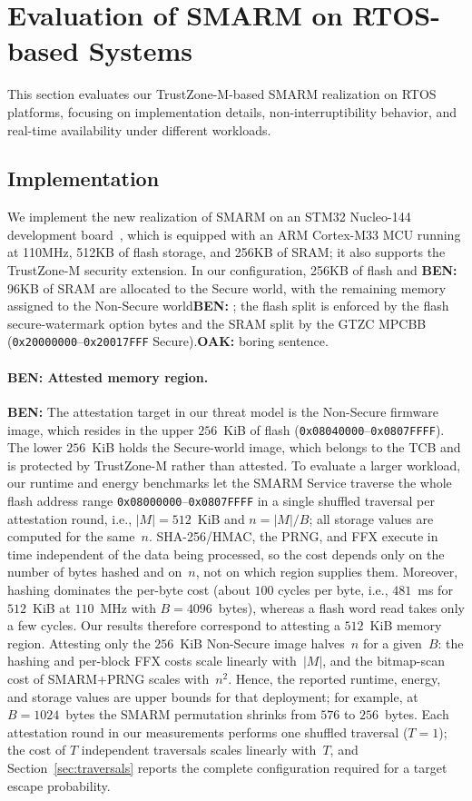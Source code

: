 \documentclass{ieeeaccess}
\DeclareRobustCommand{\oak}[1]{{\color{OAKcolor}\textbf{OAK:} #1}}
\DeclareRobustCommand{\ben}[1]{{\color{BENcolor}\textbf{BEN:} #1}}
\newcommand{\rtsmarmone}{SMARM+PRNG\xspace}
\begin{document}
\section{Evaluation of SMARM on RTOS-based Systems}
\label{sec:evaluation}

This section evaluates our TrustZone-M-based SMARM realization on RTOS platforms, focusing on implementation details, non-interruptibility behavior, and real-time availability under different workloads.

\subsection{Implementation}

We implement the new realization of SMARM on an STM32 Nucleo-144 development board~\cite{stm32l552_nucleo144}, which is equipped with an ARM Cortex-M33 MCU running at 110MHz, 512KB of flash storage, and 256KB of SRAM;
it also supports the TrustZone-M security extension.
In our configuration, 256KB of flash and \ben{96KB} of SRAM are allocated to the Secure world, with the remaining memory assigned to the Non-Secure world\ben{; the flash split is enforced by the flash secure-watermark option bytes and the SRAM split by the GTZC MPCBB (\texttt{0x20000000}--\texttt{0x20017FFF} Secure)}.\oak{boring sentence.}

\paragraph{\ben{Attested memory region.}}
\ben{The attestation target in our threat model is the Non-Secure firmware image, which resides in the upper $256$~KiB of flash (\texttt{0x08040000}--\texttt{0x0807FFFF}).
The lower $256$~KiB holds the Secure-world image, which belongs to the TCB and is protected by TrustZone-M rather than attested.
To evaluate a larger workload, our runtime and energy benchmarks let the SMARM Service traverse the whole flash address range \texttt{0x08000000}--\texttt{0x0807FFFF} in a single shuffled traversal per attestation round, i.e., $|M| = 512$~KiB and $n = |M|/B$; all storage values are computed for the same~$n$.
SHA-256/HMAC, the PRNG, and FFX execute in time independent of the data being processed, so the cost depends only on the number of bytes hashed and on~$n$, not on which region supplies them.
Moreover, hashing dominates the per-byte cost (about $100$ cycles per byte, i.e., $481$~ms for $512$~KiB at $110$~MHz with $B = 4096$~bytes), whereas a flash word read takes only a few cycles.
Our results therefore correspond to attesting a $512$~KiB memory region.
Attesting only the $256$~KiB Non-Secure image halves~$n$ for a given~$B$: the hashing and per-block FFX costs scale linearly with~$|M|$, and the bitmap-scan cost of \rtsmarmone scales with~$n^2$.
Hence, the reported runtime, energy, and storage values are upper bounds for that deployment; for example, at $B = 1024$~bytes the SMARM permutation shrinks from $576$ to $256$~bytes.
Each attestation round in our measurements performs one shuffled traversal ($T = 1$); the cost of $T$ independent traversals scales linearly with~$T$, and Section~\ref{sec:traversals} reports the complete configuration required for a target escape probability.}
\end{document}
